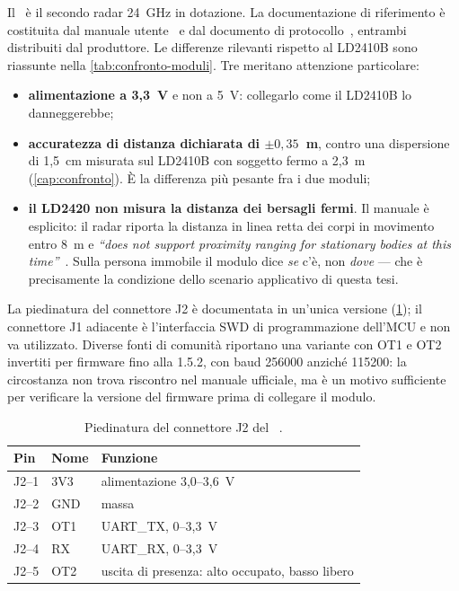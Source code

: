 Il \ldc\ è il secondo radar 24~GHz in dotazione. La documentazione di
riferimento è costituita dal manuale utente~\cite{hilinkManualLD2420} e dal
documento di protocollo~\cite{hilinkProtoLD2420}, entrambi distribuiti dal
produttore. Le differenze rilevanti rispetto al LD2410B sono riassunte nella
\cref{tab:confronto-moduli}. Tre meritano attenzione particolare:

\begin{itemize}[leftmargin=1.4em,itemsep=2pt]
  \item \textbf{alimentazione a 3,3~V} e non a 5~V: collegarlo come il LD2410B lo
        danneggerebbe;
  \item \textbf{accuratezza di distanza dichiarata di $\pm 0,35$~m}, contro una
        dispersione di 1,5~cm misurata sul LD2410B con soggetto fermo a 2,3~m
        (\cref{cap:confronto}). È la differenza più pesante fra i due moduli;
  \item \textbf{il LD2420 non misura la distanza dei bersagli fermi}. Il manuale è
        esplicito: il radar riporta la distanza in linea retta dei corpi in
        movimento entro 8~m e \emph{``does not support proximity ranging for
        stationary bodies at this time''}~\cite[§8]{hilinkManualLD2420}. Sulla
        persona immobile il modulo dice \emph{se} c'è, non \emph{dove} --- che è
        precisamente la condizione dello scenario applicativo di questa tesi.
\end{itemize}

La piedinatura del connettore J2 è documentata in un'unica versione
(\cref{tab:ld2420-pin}); il connettore J1 adiacente è l'interfaccia SWD di
programmazione dell'MCU e non va utilizzato. Diverse fonti di comunità riportano
una variante con OT1 e OT2 invertiti per firmware fino alla 1.5.2, con baud
256000 anziché 115200: la circostanza non trova riscontro nel manuale ufficiale,
ma è un motivo sufficiente per verificare la versione del firmware prima di
collegare il modulo.

\begin{table}[htbp]
\centering
\caption{Piedinatura del connettore J2 del \ldc~\cite[Tab.~3-2]{hilinkManualLD2420}.}
\label{tab:ld2420-pin}
\small
\begin{tabularx}{\linewidth}{@{}llX@{}}
\toprule
\textbf{Pin} & \textbf{Nome} & \textbf{Funzione} \\
\midrule
J2--1 & 3V3 & alimentazione 3,0--3,6~V \\
J2--2 & GND & massa \\
J2--3 & OT1 & UART\_TX, 0--3,3~V \\
J2--4 & RX  & UART\_RX, 0--3,3~V \\
J2--5 & OT2 & uscita di presenza: alto occupato, basso libero \\
\bottomrule
\end{tabularx}
\end{table}

